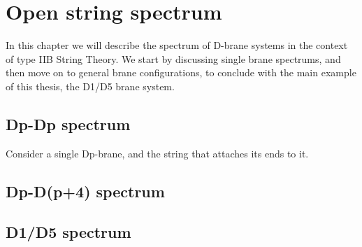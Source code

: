 

\chapter{Open string spectrum}
\label{chap:spectrum}
\pagestyle{fancy}

In this chapter we will describe the spectrum of D-brane systems in the context of type IIB String Theory. We start by discussing single brane spectrums, and then move on to general brane configurations, to conclude with the main example of this thesis, the D1/D5 brane system.

\section{Dp-Dp spectrum}

Consider a single Dp-brane, and the string that attaches its ends to it.

\section{Dp-D(p+4) spectrum}

\section{D1/D5 spectrum}